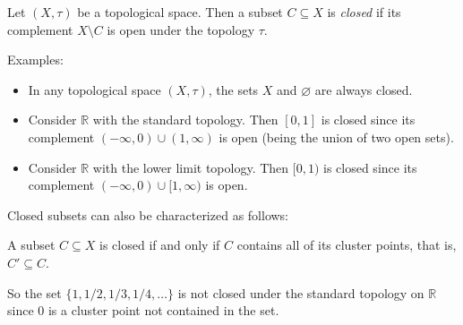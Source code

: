 \documentclass[12pt]{article}
\def\R{\mathbb{R}}
\def\emptyset{\varnothing}
\begin{document}

Let $(X,\tau)$ be a topological space. Then a subset $C\subseteq X$ is \emph{closed} if its complement $X\setminus C$ is open under the topology $\tau$.

Examples:
\begin{itemize}
\item In any topological space $(X,\tau)$, the sets $X$ and $\emptyset$ are always closed.

\item Consider $\R$ with the standard topology. Then $[0,1]$ is closed since its complement $(-\infty,0) \cup (1,\infty)$ is open (being the union of two open sets).

\item Consider $\R$ with the lower limit topology. Then $[0,1)$ is closed since its complement $(-\infty,0)\cup[1,\infty)$ is open.
\end{itemize}

Closed subsets can also be characterized as follows:

A subset $C\subseteq X$ is closed if and only if $C$ contains all of its cluster points, that is, $C'\subseteq C$.

So the set $\{1,1/2,1/3,1/4,\ldots\}$ is not closed under the standard topology on $\R$ since $0$ is a cluster point not contained in the set.
\end{document}

